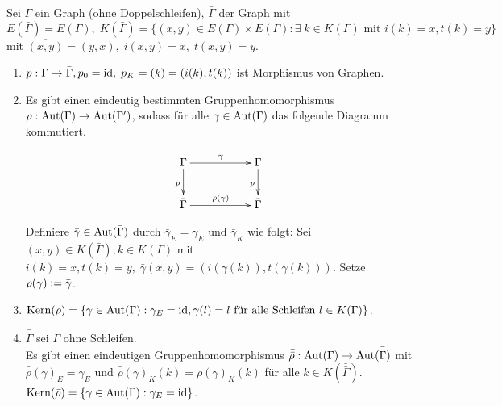 \documentclass[a4paper, 10pt]{report}
\begin{document}
\begin{Bem}
Sei $\Gamma$ ein Graph (ohne Doppelschleifen), $\bar{\Gamma}$ der Graph mit $E(\bar{\Gamma}) =
E(\Gamma), \; K(\bar{\Gamma})=\{(x,y) \in E(\Gamma) \times E(\Gamma): \exists\;k
\in K(\Gamma) \textrm{ mit }i(k)=x, t(k)=y\}$ mit $\overline{(x,y)} = (y,x),\;
i(x,y)=x,\;t(x,y)=y$.
\begin{enumerate}
  \item $p: \Gamma \to \bar{\Gamma}, p_0=\textrm{id}, \; p_K=(k)=(i(k),t(k))$ ist
  Morphismus von Graphen.
  \item Es gibt einen eindeutig bestimmten Gruppenhomomorphismus $\rho:
  \mbox{Aut}(\Gamma) \to \mbox{Aut}(\Gamma')$, sodass für alle $\gamma \in \mbox{Aut}(\Gamma)$ das
  folgende Diagramm kommutiert.

  $$
  \begin{xy}
  \xymatrix{
  \Gamma \ar[rr]^{\gamma} \ar[d]_{p}  & & \Gamma \ar[d]_{p} \\
  \bar{\Gamma} \ar[rr]^{\rho(\gamma)} & & \bar{\Gamma}
  }
  \end{xy}
  $$

  \begin{Bew}
  Definiere $\bar{\gamma} \in \mbox{Aut}(\bar{\Gamma})$ durch $\bar{\gamma}_E =
  \gamma_E$ und $\bar{\gamma}_K$ wie folgt:
  Sei $(x,y) \in K(\bar{\Gamma}), k \in K(\Gamma)$ mit $i(k)=x, t(k)=y, \; 
  \bar{\gamma}(x,y)=(i(\gamma(k)),t(\gamma(k)))$. Setze $\rho(\gamma) \mathrel{\mathop:}=
  \bar{\gamma}$.
  \end{Bew}
  \item $\mbox{Kern}(\rho) = \{ \gamma \in \mbox{Aut}(\Gamma): \gamma_E = \textrm{id}, \gamma(l)=l
  \textrm{ für alle Schleifen } l \in K(\Gamma)\}$.
  \item $\bar{\bar{\Gamma}}$ sei $\bar{\Gamma}$ ohne Schleifen.\\
  Es gibt einen eindeutigen Gruppenhomomorphismus $\bar{\bar{\rho}}:
  \mbox{Aut}(\Gamma) \to \mbox{Aut}(\bar{\bar{\Gamma}})$ mit $\bar{\bar{\rho}}(\gamma)_E =
  \gamma_E$ und $\bar{\bar{\rho}}(\gamma)_K(k) = \rho(\gamma)_K(k)$ für alle $k
  \in K(\bar{\bar{\Gamma}})$.\\
  $\mbox{Kern}(\bar{\bar{\rho}}) = \{ \gamma \in \mbox{Aut}(\Gamma): \gamma_E = \textrm{id}\}$.
\end{enumerate}
\end{Bem}
\end{document}
